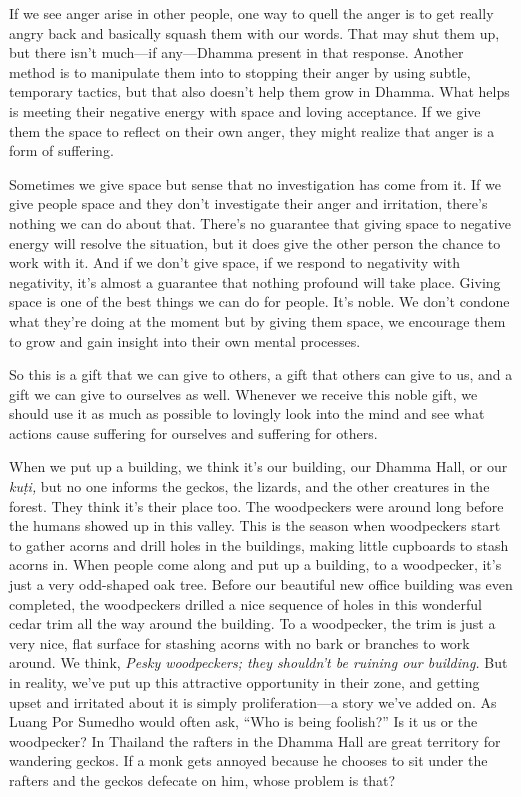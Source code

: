 If we see anger arise in other people, one way to quell the anger is to 
get really angry back and basically squash them with our words. That 
may shut them up, but there isn't much---if any---Dhamma present in 
that response. Another method is to manipulate them into to stopping 
their anger by using subtle, temporary tactics, but that also doesn't 
help them grow in Dhamma. What helps is meeting their negative energy 
with space and loving acceptance. If we give them the space to reflect 
on their own anger, they might realize that anger is a form of 
suffering.

Sometimes we give space but sense that no investigation has come from 
it. If we give people space and they don't investigate their anger and 
irritation, there's nothing we can do about that. There's no guarantee 
that giving space to negative energy will resolve the situation, but it 
does give the other person the chance to work with it. And if we don't 
give space, if we respond to negativity with negativity, it's almost a 
guarantee that nothing profound will take place. Giving space is one of 
the best things we can do for people. It's noble. We don't condone what 
they're doing at the moment but by giving them space, we encourage them 
to grow and gain insight into their own mental processes.

So this is a gift that we can give to others, a gift that others can 
give to us, and a gift we can give to ourselves as well. Whenever we 
receive this noble gift, we should use it as much as possible to 
lovingly look into the mind and see what actions cause suffering for 
ourselves and suffering for others.


When we put up a building, we think it's our building, our Dhamma Hall, 
or our \emph{kuṭi,} but no one informs the geckos, the lizards, and 
the other creatures in the forest. They think it's their place too. The 
woodpeckers were around long before the humans showed up in this 
valley. This is the season when woodpeckers start to gather acorns and 
drill holes in the buildings, making little cupboards to stash acorns 
in. When people come along and put up a building, to a woodpecker, it's 
just a very odd-shaped oak tree. Before our beautiful new office 
building was even completed, the woodpeckers drilled a nice sequence of 
holes in this wonderful cedar trim all the way around the building. To 
a woodpecker, the trim is just a very nice, flat surface for stashing 
acorns with no bark or branches to work around. We think, \emph{Pesky 
woodpeckers; they shouldn't be ruining our building.} But in reality, 
we've put up this attractive opportunity in their zone, and getting 
upset and irritated about it is simply proliferation---a story we've 
added on. As Luang Por Sumedho would often ask, ``Who is being 
foolish?'' Is it us or the woodpecker? In Thailand the rafters in the 
Dhamma Hall are great territory for wandering geckos. If a monk gets 
annoyed because he chooses to sit under the rafters and the geckos 
defecate on him, whose problem is that?

